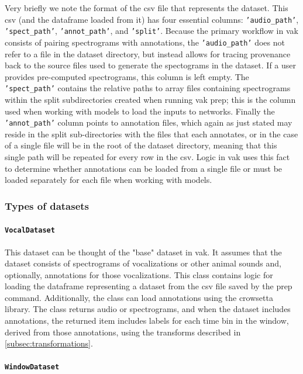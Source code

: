 Very briefly we note the format of the csv file that represents the dataset. This csv (and the dataframe loaded from it) has four essential columns: \texttt{'audio\_path'}, \texttt{'spect\_path'}, \texttt{'annot\_path'}, and \texttt{'split'}. Because the primary workflow in vak consists of pairing spectrograms with annotations, the \texttt{'audio\_path'} does not refer to a file in the dataset directory, but instead allows for tracing provenance back to the source files used to generate the spectograms in the dataset. If a user provides pre-computed spectrograms, this column is left empty. The \texttt{'spect\_path'} contains the relative paths to array files containing spectrograms within the split subdirectories created when running vak prep; this is the column used when working with models to load the inputs to networks. Finally the \texttt{'annot\_path'} column points to annotation files, which again as just stated may reside in the split sub-directories with the files that each annotates, or in the case of a single file will be in the root of the dataset directory, meaning that this single path will be repeated for every row in the csv. Logic in vak uses this fact to determine whether annotations can be loaded from a single file or must be loaded separately for each file when working with models.

\subsubsection{Types of datasets \label{subsubsec:dataset-types}}

\paragraph{\texttt{VocalDataset}}

This dataset can be thought of the "base" dataset in vak.
It assumes that the dataset consists of spectrograms of
vocalizations or other animal sounds and, optionally, annotations
for those vocalizations.
This class contains logic for loading the dataframe
representing a dataset from the csv file saved by the prep command.
Additionally, the class can load annotations
using the crowsetta library.
The class returns audio or spectrograms,
and when the dataset includes annotations,
the returned item includes labels for each
time bin in the window, derived from those annotations,
using the transforms described in \ref{subsec:transformations}.

\paragraph{\texttt{WindowDataset}}

